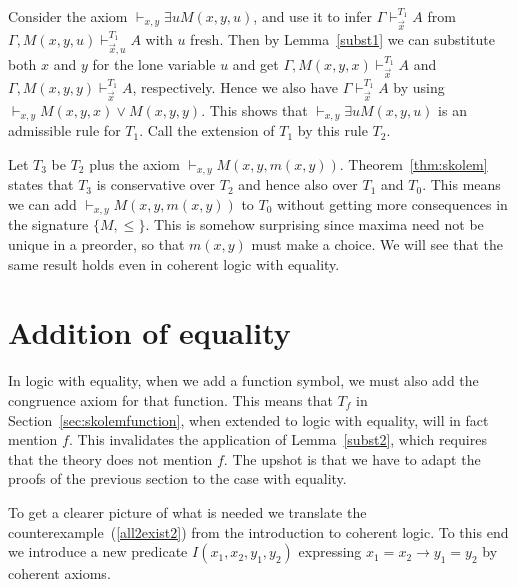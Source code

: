 \documentclass{fundam}
\newcommand{\set}[1]{\{#1\}}
\begin{document}
Consider the axiom $\vdash_{x,y} \exists u M(x,y,u)$, and use it
to infer $\Gamma \vdash_{\vec{x}}^{T_1} A$ from
$\Gamma,M(x,y,u) \vdash_{\vec{x},u}^{T_1} A$ with $u$ fresh.
Then by Lemma~\ref{subst1} we can substitute both $x$ and $y$ 
for the lone variable $u$ and get $\Gamma,M(x,y,x) \vdash_{\vec{x}}^{T_1} A$
and $\Gamma,M(x,y,y) \vdash_{\vec{x}}^{T_1} A$, respectively.
Hence we also have $\Gamma \vdash_{\vec{x}}^{T_1} A$
by using $\vdash_{x,y} M(x,y,x)  \lor M(x,y,y)$.
This shows that $\vdash_{x,y} \exists u M(x,y,u)$ is an admissible rule
for $T_1$. Call the extension of $T_1$ by this rule $T_2$.

Let $T_3$ be $T_2$ plus the axiom $\vdash_{x,y} M(x,y,m(x,y))$. 
Theorem~\ref{thm:skolem} states that  $T_3$ is conservative over
$T_2$ and hence also over $T_1$ and $T_0$. This means we can add
$\vdash_{x,y} M(x,y,m(x,y))$ to $T_0$ without getting more consequences
in the signature $\set{M,{\leq}}$. This is somehow surprising since maxima
need not be unique in a preorder, so that $m(x,y)$ must make a choice.
 We will see that the same result holds even in coherent logic with equality.


\section{Addition of equality}\label{sec:addequality}

In logic with equality, when we add a function symbol, 
we must also add the congruence axiom for that function. 
This means that $T_f$ in Section~\ref{sec:skolemfunction},
when extended to  logic with equality, will in fact mention $f$. 
This invalidates the application of Lemma~\ref{subst2}, 
which requires that the theory does not mention $f$.
The upshot is that we have to adapt the proofs of the
previous section to the case with equality.

To get a clearer picture of what is needed we translate the 
counterexample~(\ref{all2exist2}) from the introduction to coherent logic.
To this end we introduce a new predicate $I(x_1,x_2,y_1,y_2)$
expressing $x_1=x_2 \to y_1=y_2$ by coherent axioms.
\end{document}
